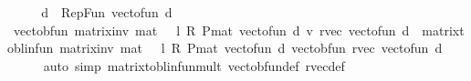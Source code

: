\begin{isabellebody}
%
\isadelimproof
%
\endisadelimproof
%
\isatagproof
{}\isamarkupfalse%
\ {\isacharminus}{\kern0pt}\isanewline
\ \ \isamarkupfalse%
\ {\isacharquery}{\kern0pt}d\ {\isacharequal}{\kern0pt}\ {\isachardoublequoteopen}Rep{\isacharunderscore}{\kern0pt}Fun\ {\isacharparenleft}{\kern0pt}vec{\isacharunderscore}{\kern0pt}to{\isacharunderscore}{\kern0pt}fun\ d{\isacharparenright}{\kern0pt}{\isachardoublequoteclose}\isanewline
\ \ \isamarkupfalse%
\ {\isachardoublequoteopen}vec{\isacharunderscore}{\kern0pt}to{\isacharunderscore}{\kern0pt}bfun\ {\isacharparenleft}{\kern0pt}matrix{\isacharunderscore}{\kern0pt}inv\ {\isacharparenleft}{\kern0pt}mat\ {}\ {\isacharminus}{\kern0pt}\ l\ {\isacharasterisk}{\kern0pt}\isactrlsub R\ {\isacharparenleft}{\kern0pt}P{\isacharunderscore}{\kern0pt}mat\ {\isacharparenleft}{\kern0pt}vec{\isacharunderscore}{\kern0pt}to{\isacharunderscore}{\kern0pt}fun\ d{\isacharparenright}{\kern0pt}{\isacharparenright}{\kern0pt}{\isacharparenright}{\kern0pt}\ {\isacharasterisk}{\kern0pt}v\ {\isacharparenleft}{\kern0pt}r{\isacharunderscore}{\kern0pt}vec{\isacharprime}{\kern0pt}\ {\isacharparenleft}{\kern0pt}vec{\isacharunderscore}{\kern0pt}to{\isacharunderscore}{\kern0pt}fun\ d{\isacharparenright}{\kern0pt}{\isacharparenright}{\kern0pt}{\isacharparenright}{\kern0pt}\ {\isacharequal}{\kern0pt}\ matrix{\isacharunderscore}{\kern0pt}to{\isacharunderscore}{\kern0pt}blinfun\ {\isacharparenleft}{\kern0pt}matrix{\isacharunderscore}{\kern0pt}inv\ {\isacharparenleft}{\kern0pt}mat\ {}\ {\isacharminus}{\kern0pt}\ l\ {\isacharasterisk}{\kern0pt}\isactrlsub R\ {\isacharparenleft}{\kern0pt}P{\isacharunderscore}{\kern0pt}mat\ {\isacharparenleft}{\kern0pt}vec{\isacharunderscore}{\kern0pt}to{\isacharunderscore}{\kern0pt}fun\ d{\isacharparenright}{\kern0pt}{\isacharparenright}{\kern0pt}{\isacharparenright}{\kern0pt}{\isacharparenright}{\kern0pt}\ {\isacharparenleft}{\kern0pt}vec{\isacharunderscore}{\kern0pt}to{\isacharunderscore}{\kern0pt}bfun\ {\isacharparenleft}{\kern0pt}r{\isacharunderscore}{\kern0pt}vec{\isacharprime}{\kern0pt}\ {\isacharparenleft}{\kern0pt}vec{\isacharunderscore}{\kern0pt}to{\isacharunderscore}{\kern0pt}fun\ d{\isacharparenright}{\kern0pt}{\isacharparenright}{\kern0pt}{\isacharparenright}{\kern0pt}{\isachardoublequoteclose}\isanewline
\ \ \ \ \isamarkupfalse%
\ {\isacharparenleft}{\kern0pt}auto\ simp{\isacharcolon}{\kern0pt}\ matrix{\isacharunderscore}{\kern0pt}to{\isacharunderscore}{\kern0pt}blinfun{\isacharunderscore}{\kern0pt}mult\ vec{\isacharunderscore}{\kern0pt}to{\isacharunderscore}{\kern0pt}bfun{\isacharunderscore}{\kern0pt}def\ r{\isacharunderscore}{\kern0pt}vec{\isacharprime}{\kern0pt}{\isacharunderscore}{\kern0pt}def{\isacharparenright}{\kern0pt}\isanewline

\end{isabellebody}
